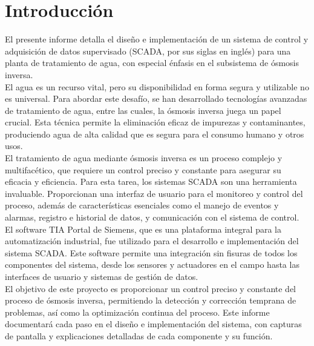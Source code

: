 \chapter*{Introducción}

El presente informe detalla el diseño e implementación de un sistema de control y adquisición de datos supervisado (SCADA, por sus siglas en inglés) para una planta de tratamiento de agua, con especial énfasis en el subsistema de ósmosis inversa.\\

El agua es un recurso vital, pero su disponibilidad en forma segura y utilizable no es universal. Para abordar este desafío, se han desarrollado tecnologías avanzadas de tratamiento de agua, entre las cuales, la ósmosis inversa juega un papel crucial. Esta técnica permite la eliminación eficaz de impurezas y contaminantes, produciendo agua de alta calidad que es segura para el consumo humano y otros usos.\\

El tratamiento de agua mediante ósmosis inversa es un proceso complejo y multifacético, que requiere un control preciso y constante para asegurar su eficacia y eficiencia. Para esta tarea, los sistemas SCADA son una herramienta invaluable. Proporcionan una interfaz de usuario para el monitoreo y control del proceso, además de características esenciales como el manejo de eventos y alarmas, registro e historial de datos, y comunicación con el sistema de control.\\

El software TIA Portal de Siemens, que es una plataforma integral para la automatización industrial, fue utilizado para el desarrollo e implementación del sistema SCADA. Este software permite una integración sin fisuras de todos los componentes del sistema, desde los sensores y actuadores en el campo hasta las interfaces de usuario y sistemas de gestión de datos.\\

El objetivo de este proyecto es proporcionar un control preciso y constante del proceso de ósmosis inversa, permitiendo la detección y corrección temprana de problemas, así como la optimización continua del proceso. Este informe documentará cada paso en el diseño e implementación del sistema, con capturas de pantalla y explicaciones detalladas de cada componente y su función.